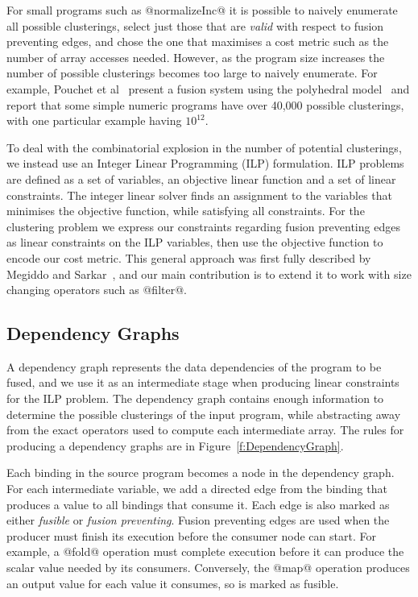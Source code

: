 For small programs such as @normalizeInc@ it is possible to naively enumerate all possible clusterings, select just those that are \emph{valid} with respect to fusion preventing edges, and chose the one that maximises a cost metric such as the number of array accesses needed. However, as the program size increases the number of possible clusterings becomes too large to naively enumerate. For example, Pouchet et al~\cite{pouchet2010combined} present a fusion system using the polyhedral model~\cite{pouchet2011polyhedral} and report that some simple numeric programs have over 40,000 possible clusterings, with one particular example having $10^{12}$. 

To deal with the combinatorial explosion in the number of potential clusterings, we instead use an Integer Linear Programming (ILP) formulation. ILP problems are defined as a set of variables, an objective linear function and a set of linear constraints. The integer linear solver finds an assignment to the variables that minimises the objective function, while satisfying all constraints. For the clustering problem we express our constraints regarding fusion preventing edges as linear constraints on the ILP variables, then use the objective function to encode our cost metric. This general approach was first fully described by Megiddo and Sarkar~\cite{megiddo1998optimal}, and our main contribution is to extend it to work with size changing operators such as @filter@. 



\subsection{Dependency Graphs}
A dependency graph represents the data dependencies of the program to be fused, and we use it as an intermediate stage when producing linear constraints for the ILP problem. The dependency graph contains enough information to determine the possible clusterings of the input program, while abstracting away from the exact operators used to compute each intermediate array. The rules for producing a dependency graphs are in Figure~\ref{f:DependencyGraph}.

Each binding in the source program becomes a node in the dependency graph. For each intermediate variable, we add a directed edge from the binding that produces a value to all bindings that consume it. Each edge is also marked as either \emph{fusible} or \emph{fusion preventing}. Fusion preventing edges are used when the producer must finish its execution before the consumer node can start. For example, a @fold@ operation must complete execution before it can produce the scalar value needed by its consumers. Conversely, the @map@ operation produces an output value for each value it consumes, so is marked as fusible. 

